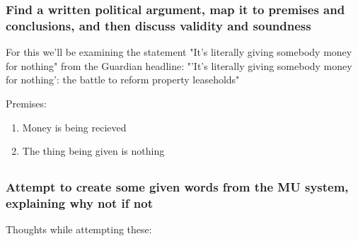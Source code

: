 \documentclass{article}
\begin{document}
\subsubsection{Find a written political argument, map it to
premises and conclusions, and then discuss validity and soundness}

For this we'll be examining the statement
"It's literally giving somebody money for nothing"
from the Guardian headline:
"'It's literally giving somebody money for nothing':
the battle to reform property leaseholds" \cite{kollwew:2024}

Premises:
\begin{enumerate}
	\item Money is being recieved
	\item The thing being given is nothing
\end{enumerate}

 

\subsection{}

\subsubsection{Attempt to create some given words from the MU
system, explaining why not if not}
Thoughts while attempting these:
\end{document}
